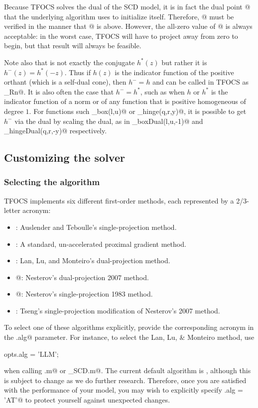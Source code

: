\documentclass{article}
\newcommand{\<}{\langle}
\renewcommand{\>}{\rangle}
\begin{document}
Because TFOCS solves the dual of the SCD model, it is in fact the dual point
@ that the underlying algorithm uses to initialize itself. Therefore,
@ must be verified in the manner that @ is above. However,
the all-zero value of @ is always acceptable:
in the worst case, TFOCS will have to project away from zero to begin,
but that result will always be feasible.

Note also that \verb@conjnegF@ is not exactly the conjugate $h^*(z)$ but rather
it is $h^{-}(z) = h^*(-z)$. Thus if $h(z)$ is the indicator function of the positive
orthant (which is a self-dual cone), then $h^{-}=h$ and can be called
in TFOCS as \verb@proj_Rn@.  It is also often the case that $h^{-} = h^*$,
such as when $h$ or $h^*$ is the indicator function of a norm or of any function
that is positive homogeneous of degree $1$. For functions such \verb@proj_box(l,u)@
or \verb@prox_hinge(q,r,y)@, it is possible to get $h^{-}$ via the dual by scaling
the dual, as in \verb@prox_boxDual(l,u,-1)@ and \verb@prox_hingeDual(q,r,-y)@ respectively.

\subsection{Customizing the solver}

\subsubsection{Selecting the algorithm}

TFOCS implements six different first-order methods, 
each represented by a 2/3-letter acronym:
\begin{itemize}
\itemsep 0pt
\item \verb@AT@: Auslender and Teboulle's single-projection method.
\item \verb@GRA@: A standard, un-accelerated proximal gradient method.
\item \verb@LLM@: Lan, Lu, and Monteiro's dual-projection method.
\item {}@: Nesterov's dual-projection 2007 method.
\item {}@: Nesterov's single-projection 1983 method.
\item \verb@TS@: Tseng's single-projection modification of Nesterov's 2007 method.
\end{itemize}
To select one of these algorithms explicitly, provide the corresponding
acronym in the \verb@opts.alg@ parameter. For instance,
to select the Lan, Lu, \& Monteiro method, use
\begin{code}
	opts.alg = 'LLM';
\end{code}
when calling  \verb@tfocs.m@ or \verb@tfocs_SCD.m@. The current default
algorithm is \verb@AT@, although this is subject to change as we do
further research. Therefore, once you are satisfied with the performance
of your model, you may wish to explicitly specify \verb@opts.alg = 'AT'@
to protect yourself against unexpected changes.
\end{document}
